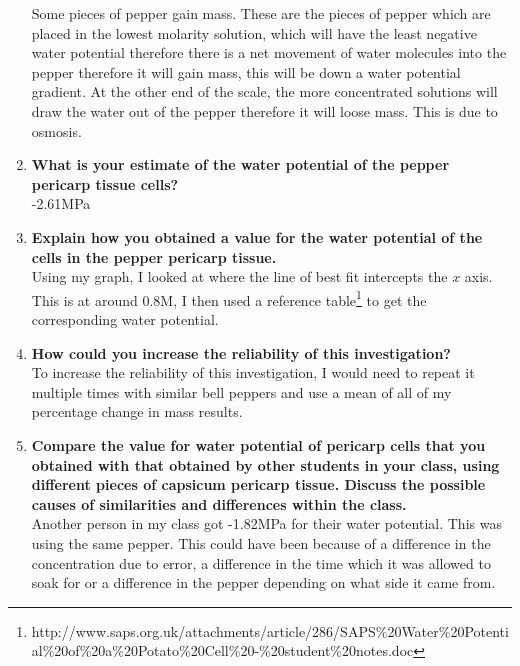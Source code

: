 \documentclass{thomasClass}
\begin{document}
\begin{enumerate}
    Some pieces of pepper gain mass. These are the pieces of pepper which are placed in the lowest molarity solution, which will have the least negative water potential therefore there is a net movement of water molecules into the pepper therefore it will gain mass, this will be down a water potential gradient. At the other end of the scale, the more concentrated solutions will draw the water out of the pepper therefore it will loose mass. This is due to osmosis.  
    \item \textbf{What is your estimate of the water potential of the pepper pericarp tissue cells?}\\
    -2.61MPa
    \item \textbf{Explain how you obtained a value for the water potential of the cells in the pepper pericarp tissue.}\\
    Using my graph, I looked at where the line of best fit intercepts the $x$ axis. This is at around 0.8M, I then used a reference table\footnote{http://www.saps.org.uk/attachments/article/286/SAPS\%20Water\%20Potential\%20of\%20a\%20Potato\%20Cell\%20-\%20student\%20notes.doc} to get the corresponding water potential. 
    \item \textbf{How could you increase the reliability of this investigation?}\\
    To increase the reliability of this investigation, I would need to repeat it multiple times with similar bell peppers and use a mean of all of my percentage change in mass results.
    \item \textbf{Compare the value for water potential of pericarp cells that you obtained with that obtained by other students in your class, using different pieces of capsicum pericarp tissue. Discuss the possible causes of similarities and differences within the class.}\\
    Another person in my class got -1.82MPa for their water potential. This was using the same pepper. This could have been because of a difference in the concentration due to error, a difference in the time which it was allowed to soak for or a difference in the pepper depending on what side it came from.  
    
\end{enumerate}
\end{document}
